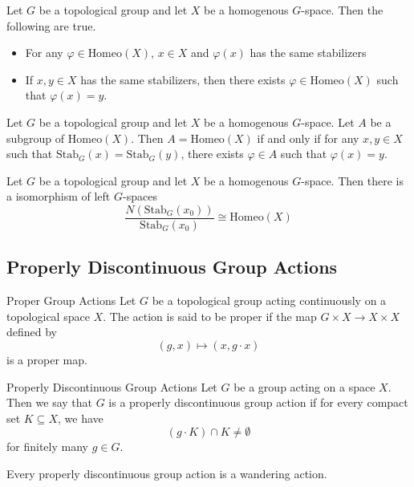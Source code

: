 \documentclass[a4paper]{article}
\begin{document}
\begin{thm}{}{} Let $G$ be a topological group and let $X$ be a homogenous $G$-space. Then the following are true. 
\begin{itemize}
\item For any $\varphi\in\text{Homeo}(X)$, $x\in X$ and $\varphi(x)$ has the same stabilizers
\item If $x,y\in X$ has the same stabilizers, then there exists $\varphi\in\text{Homeo}(X)$ such that $\varphi(x)=y$. 
\end{itemize}
\end{thm}

\begin{lmm}{}{} Let $G$ be a topological group and let $X$ be a homogenous $G$-space. Let $A$ be a subgroup of $\text{Homeo}(X)$. Then $A=\text{Homeo}(X)$ if and only if for any $x,y\in X$ such that $\text{Stab}_G(x)=\text{Stab}_G(y)$, there exists $\varphi\in A$ such that $\varphi(x)=y$. 
\end{lmm}

\begin{thm}{}{} Let $G$ be a topological group and let $X$ be a homogenous $G$-space. Then there is a isomorphism of left $G$-spaces $$\frac{N(\text{Stab}_G(x_0))}{\text{Stab}_G(x_0)}\cong\text{Homeo}(X)$$
\end{thm}

\subsection{Properly Discontinuous Group Actions}
\begin{defn}{Proper Group Actions}{} Let $G$ be a topological group acting continuously on a topological space $X$. The action is said to be proper if the map $G\times X\to X\times X$ defined by $$(g,x)\mapsto(x,g\cdot x)$$ is a proper map. 
\end{defn}

\begin{defn}{Properly Discontinuous Group Actions}{} Let $G$ be a group acting on a space $X$. Then we say that $G$ is a properly discontinuous group action if for every compact set $K\subseteq X$, we have $$(g\cdot K)\cap K\neq\emptyset$$ for finitely many $g\in G$. 
\end{defn}

\begin{prp}{}{} Every properly discontinuous group action is a wandering action. 
\end{prp}
\end{document}
